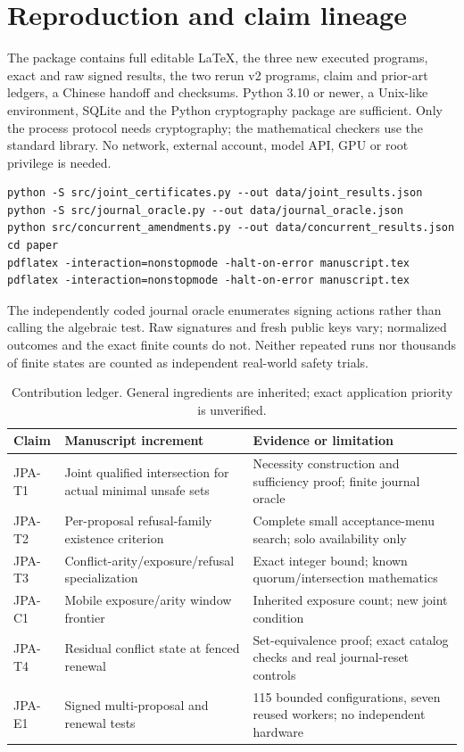 \documentclass[11pt,a4paper]{article}
\theoremstyle{definition}\newtheorem{definition}{Definition}
\begin{document}
\section{Reproduction and claim lineage}
The package contains full editable LaTeX, the three new executed programs, exact and raw signed results, the two rerun v2 programs, claim and prior-art ledgers, a Chinese handoff and checksums. Python 3.10 or newer, a Unix-like environment, SQLite and the Python cryptography package are sufficient. Only the process protocol needs cryptography; the mathematical checkers use the standard library. No network, external account, model API, GPU or root privilege is needed.
\begin{lstlisting}
python -S src/joint_certificates.py --out data/joint_results.json
python -S src/journal_oracle.py --out data/journal_oracle.json
python src/concurrent_amendments.py --out data/concurrent_results.json
cd paper
pdflatex -interaction=nonstopmode -halt-on-error manuscript.tex
pdflatex -interaction=nonstopmode -halt-on-error manuscript.tex
\end{lstlisting}
The independently coded journal oracle enumerates signing actions rather than calling the algebraic test. Raw signatures and fresh public keys vary; normalized outcomes and the exact finite counts do not. Neither repeated runs nor thousands of finite states are counted as independent real-world safety trials.

\begin{table}[ht]\centering\small
\caption{Contribution ledger. General ingredients are inherited; exact application priority is unverified.}
\begin{tabularx}{\linewidth}{@{}lXX@{}}\toprule
Claim & Manuscript increment & Evidence or limitation\\\midrule
JPA-T1 & Joint qualified intersection for actual minimal unsafe sets & Necessity construction and sufficiency proof; finite journal oracle\\
JPA-T2 & Per-proposal refusal-family existence criterion & Complete small acceptance-menu search; solo availability only\\
JPA-T3 & Conflict-arity/exposure/refusal specialization & Exact integer bound; known quorum/intersection mathematics\\
JPA-C1 & Mobile exposure/arity window frontier & Inherited exposure count; new joint condition\\
JPA-T4 & Residual conflict state at fenced renewal & Set-equivalence proof; exact catalog checks and real journal-reset controls\\
JPA-E1 & Signed multi-proposal and renewal tests & 115 bounded configurations, seven reused workers; no independent hardware\\\bottomrule
\end{tabularx}
\end{table}
\end{document}
